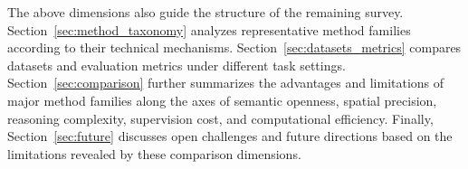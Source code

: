 The above dimensions also guide the structure of the remaining survey. 
Section~\ref{sec:method_taxonomy} analyzes representative method families according to their technical mechanisms. 
Section~\ref{sec:datasets_metrics} compares datasets and evaluation metrics under different task settings. 
Section~\ref{sec:comparison} further summarizes the advantages and limitations of major method families along the axes of semantic openness, spatial precision, reasoning complexity, supervision cost, and computational efficiency. 
Finally, Section~\ref{sec:future} discusses open challenges and future directions based on the limitations revealed by these comparison dimensions.